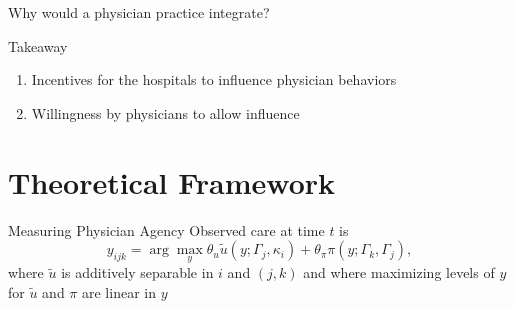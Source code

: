 \documentclass[t]{beamer}
\begin{document}
\begin{frame}{Why would a physician practice integrate?}

\end{frame}

\begin{frame}{Takeaway}
    \begin{enumerate}
        \item Incentives for the hospitals to influence physician behaviors
        \item Willingness by physicians to allow influence
    \end{enumerate}
\end{frame}


\section{Theoretical Framework}
\begin{frame}{Measuring Physician Agency}
    Observed care at time $t$ is
    \begin{equation*}
        y_{ijk} = \arg \max_{y}  \theta_{u} \tilde{u} \left(y; \Gamma_{j}, \kappa_{i} \right) + \theta_{\pi} \pi \left(y; \Gamma_{k}, \Gamma_{j} \right),
    \end{equation*}
    where $\tilde{u}$ is additively separable in $i$ and $(j,k)$ and where maximizing levels of $y$ for $\tilde{u}$ and $\pi$ are linear in $y$
\end{frame}
\end{document}
